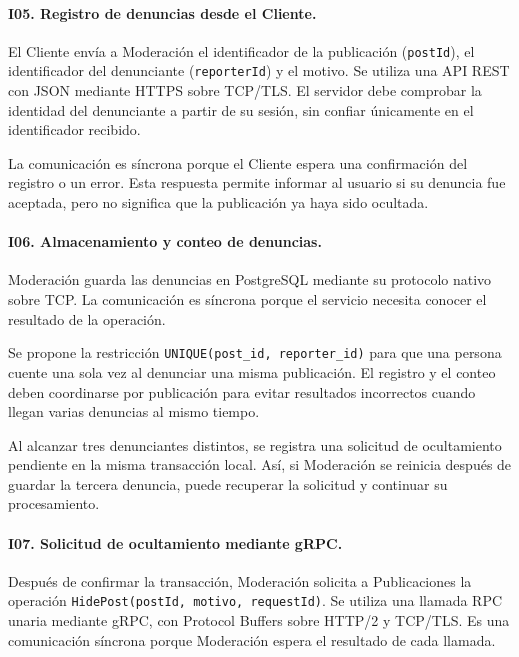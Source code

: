 \documentclass[12pt,a4paper]{article}
\begin{document}
\paragraph{I05. Registro de denuncias desde el Cliente.}

El Cliente envía a Moderación el identificador de la publicación
(\texttt{postId}), el identificador del denunciante
(\texttt{reporterId}) y el motivo. Se utiliza una API REST con
JSON mediante HTTPS sobre TCP/TLS. El servidor debe comprobar
la identidad del denunciante a partir de su sesión, sin confiar
únicamente en el identificador recibido.

La comunicación es síncrona porque el Cliente espera una
confirmación del registro o un error. Esta respuesta permite
informar al usuario si su denuncia fue aceptada, pero no significa
que la publicación ya haya sido ocultada.

\paragraph{I06. Almacenamiento y conteo de denuncias.}

Moderación guarda las denuncias en PostgreSQL mediante su
protocolo nativo sobre TCP. La comunicación es síncrona porque
el servicio necesita conocer el resultado de la operación.

Se propone la restricción
\texttt{UNIQUE(post\_id, reporter\_id)} para que una persona
cuente una sola vez al denunciar una misma publicación.
El registro y el conteo deben coordinarse por publicación
para evitar resultados incorrectos cuando llegan varias
denuncias al mismo tiempo.

Al alcanzar tres denunciantes distintos, se registra una
solicitud de ocultamiento pendiente en la misma transacción
local. Así, si Moderación se reinicia después de guardar
la tercera denuncia, puede recuperar la solicitud y continuar
su procesamiento.

\paragraph{I07. Solicitud de ocultamiento mediante gRPC.}

Después de confirmar la transacción, Moderación solicita a
Publicaciones la operación
\texttt{HidePost(postId, motivo, requestId)}. Se utiliza
una llamada RPC unaria mediante gRPC, con Protocol Buffers
sobre HTTP/2 y TCP/TLS. Es una comunicación síncrona porque
Moderación espera el resultado de cada llamada.
\end{document}

